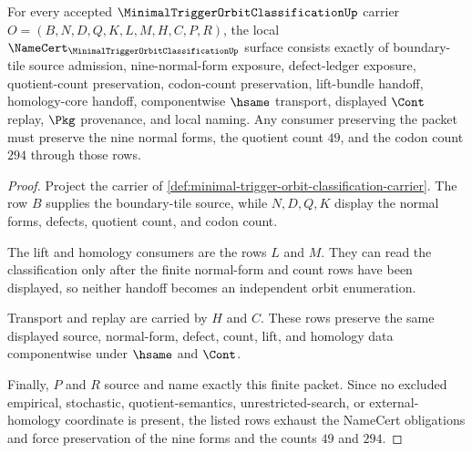\begin{theorem}
\label{thm:minimal-trigger-orbit-classification-namecert-obligations}
For every accepted $\MinimalTriggerOrbitClassificationUp$ carrier $O=(B,N,D,Q,K,L,M,H,C,P,R)$, the local $\NameCert_{\MinimalTriggerOrbitClassificationUp}$ surface consists exactly of boundary-tile source admission, nine-normal-form exposure, defect-ledger exposure, quotient-count preservation, codon-count preservation, lift-bundle handoff, homology-core handoff, componentwise $\hsame$ transport, displayed $\Cont$ replay, $\Pkg$ provenance, and local naming. Any consumer preserving the packet must preserve the nine normal forms, the quotient count $49$, and the codon count $294$ through those rows.
\end{theorem}
\begin{proof}
Project the carrier of \autoref{def:minimal-trigger-orbit-classification-carrier}. The row $B$ supplies the boundary-tile source, while $N,D,Q,K$ display the normal forms, defects, quotient count, and codon count.

The lift and homology consumers are the rows $L$ and $M$. They can read the classification only after the finite normal-form and count rows have been displayed, so neither handoff becomes an independent orbit enumeration.

Transport and replay are carried by $H$ and $C$. These rows preserve the same displayed source, normal-form, defect, count, lift, and homology data componentwise under $\hsame$ and $\Cont$.

Finally, $P$ and $R$ source and name exactly this finite packet. Since no excluded empirical, stochastic, quotient-semantics, unrestricted-search, or external-homology coordinate is present, the listed rows exhaust the NameCert obligations and force preservation of the nine forms and the counts $49$ and $294$.
\end{proof}


